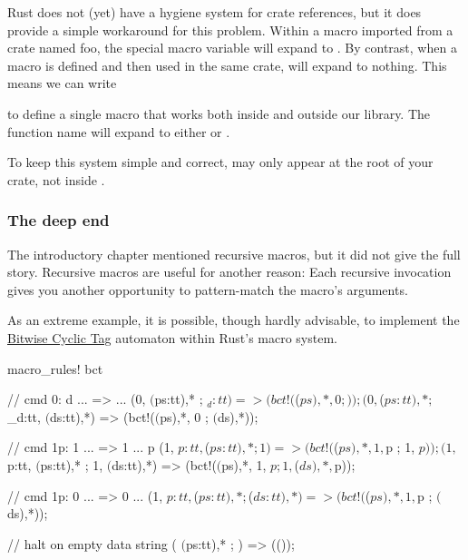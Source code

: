 \blank

Rust does not (yet) have a hygiene system for crate references, but it does provide a simple workaround for this problem. Within a 
macro imported from a crate named foo, the special macro variable  will expand to . By contrast, when a macro 
is defined and then used in the same crate,  will expand to nothing. This means we can write


to define a single macro that works both inside and outside our library. The function name will expand to either 
or .

\blank

To keep this system simple and correct,  may only appear at the root of your crate, not 
inside .

\subsubsection*{The deep end}

The introductory chapter mentioned recursive macros, but it did not give the full story. Recursive macros are useful for another 
reason: Each recursive invocation gives you another opportunity to pattern-match the macro's arguments.

\blank

As an extreme example, it is possible, though hardly advisable, to implement the 
\href{https://esolangs.org/wiki/Bitwise_Cyclic_Tag}{Bitwise Cyclic Tag} automaton within Rust's macro system.

\begin{rustc}
macro_rules! bct {
    // cmd 0:  d ... => ...
    (0, $($ps:tt),* ; $_d:tt)
        => (bct!($($ps),*, 0 ; ));
    (0, $($ps:tt),* ; $_d:tt, $($ds:tt),*)
        => (bct!($($ps),*, 0 ; $($ds),*));

    // cmd 1p:  1 ... => 1 ... p
    (1, $p:tt, $($ps:tt),* ; 1)
        => (bct!($($ps),*, 1, $p ; 1, $p));
    (1, $p:tt, $($ps:tt),* ; 1, $($ds:tt),*)
        => (bct!($($ps),*, 1, $p ; 1, $($ds),*, $p));

    // cmd 1p:  0 ... => 0 ...
    (1, $p:tt, $($ps:tt),* ; $($ds:tt),*)
        => (bct!($($ps),*, 1, $p ; $($ds),*));

    // halt on empty data string
    ( $($ps:tt),* ; )
        => (());
}
\end{rustc}

